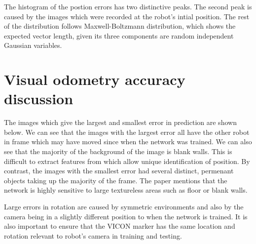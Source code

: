 \documentclass{article}
\begin{document}
The histogram of the postion errors has two distinctive peaks. The second peak is caused by the images which were recorded at the robot's intial position. The rest of the distribution follows Maxwell-Boltzmann distribution, which shows the expected vector length, given its three components are random independent Gaussian variables.

\section{Visual odometry accuracy discussion}

The images which give the largest and smallest error in prediction are shown below. We can see that the images with the largest error all have the other robot in frame which may have moved since when the network was trained. We can also see that the majority of the background of the image is blank walls. This is difficult to extract features from which allow unique identification of position. By contrast, the images with the smallest error had several distinct, permenant objects taking up the majority of the frame. The paper mentions that the network is highly sensitive to large textureless areas such as floor or blank walls.

Large errors in rotation are caused by symmetric environments and also by the camera being in a slightly different position to when the network is trained. It is also important to ensure that the VICON marker has the same location and rotation relevant to robot's camera in training and testing.
\end{document}
